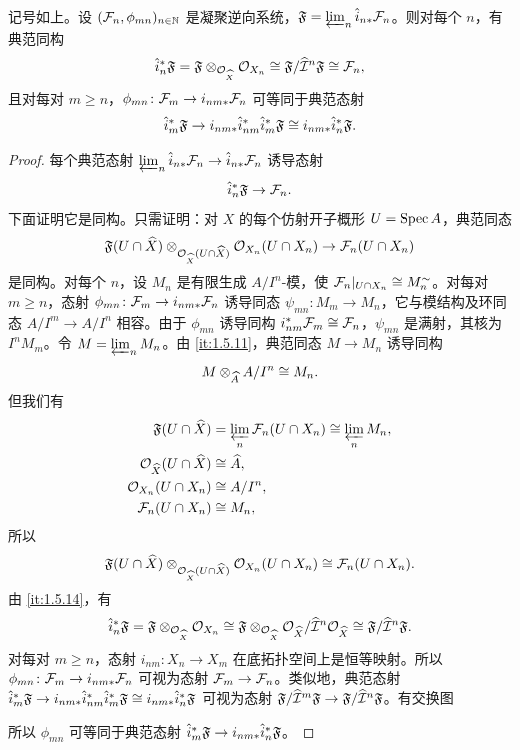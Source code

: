 \begin{proposition}\label{it:1.5.17}
记号如上。设 $(\mathcal{F}_n,\phi_{mn})_{n\in\mathbb{N}}$ 是凝聚逆向系统，$\mathfrak{F}=\varprojlim_n\hat i_{n*}\mathcal{F}_n$。则对每个 $n$，有典范同构
\[
\hat i_n^*\mathfrak{F}=\mathfrak{F}\otimes_{\mathcal{O}_{\widehat X}}\mathcal{O}_{X_n}\cong\mathfrak{F}/\widehat{\mathcal{I}}^n\mathfrak{F}\cong\mathcal{F}_n,
\]
且对每对 $m\ge n$，$\phi_{mn}\colon\mathcal{F}_m\to i_{nm*}\mathcal{F}_n$ 可等同于典范态射
\[
\hat i_m^*\mathfrak{F}\to i_{nm*}\hat i_{nm}^*\hat i_m^*\mathfrak{F}\cong i_{nm*}\hat i_n^*\mathfrak{F}.
\]
\end{proposition}

\begin{proof}
每个典范态射 $\varprojlim_n\hat i_{n*}\mathcal{F}_n\to\hat i_{n*}\mathcal{F}_n$ 诱导态射
\[
\hat i_n^*\mathfrak{F}\to\mathcal{F}_n.
\]
下面证明它是同构。只需证明：对 $X$ 的每个仿射开子概形 $U=\operatorname{Spec} A$，典范同态
\[
\mathfrak{F}(U\cap\widehat X)\otimes_{\mathcal{O}_{\widehat X}(U\cap\widehat X)}\mathcal{O}_{X_n}(U\cap X_n)\to\mathcal{F}_n(U\cap X_n)
\]
是同构。对每个 $n$，设 $M_n$ 是有限生成 $A/I^n$-模，使 $\mathcal{F}_n|_{U\cap X_n}\cong M_n^{\sim}$。对每对 $m\ge n$，态射 $\phi_{mn}\colon\mathcal{F}_m\to i_{nm*}\mathcal{F}_n$ 诱导同态 $\psi_{mn}\colon M_m\to M_n$，它与模结构及环同态 $A/I^m\to A/I^n$ 相容。由于 $\phi_{mn}$ 诱导同构 $i_{nm}^*\mathcal{F}_m\cong\mathcal{F}_n$，$\psi_{mn}$ 是满射，其核为 $I^nM_m$。令 $M=\varprojlim_n M_n$。由 \ref{it:1.5.11}，典范同态 $M\to M_n$ 诱导同构
\[
M\otimes_{\widehat A}A/I^n\cong M_n.
\]
但我们有
\begin{align*}
\mathfrak{F}(U\cap\widehat X)&=\varprojlim_n\mathcal{F}_n(U\cap X_n)\cong\varprojlim_n M_n,\\
\mathcal{O}_{\widehat X}(U\cap\widehat X)&\cong\widehat A,\\
\mathcal{O}_{X_n}(U\cap X_n)&\cong A/I^n,\\
\mathcal{F}_n(U\cap X_n)&\cong M_n,
\end{align*}
所以
\[
\mathfrak{F}(U\cap\widehat X)\otimes_{\mathcal{O}_{\widehat X}(U\cap\widehat X)}\mathcal{O}_{X_n}(U\cap X_n)\cong\mathcal{F}_n(U\cap X_n).
\]
由 \ref{it:1.5.14}，有
\[
\hat i_n^*\mathfrak{F}=\mathfrak{F}\otimes_{\mathcal{O}_{\widehat X}}\mathcal{O}_{X_n}\cong\mathfrak{F}\otimes_{\mathcal{O}_{\widehat X}}\mathcal{O}_{\widehat X}/\widehat{\mathcal{I}}^n\mathcal{O}_{\widehat X}\cong\mathfrak{F}/\widehat{\mathcal{I}}^n\mathfrak{F}.
\]
对每对 $m\ge n$，态射 $i_{nm}\colon X_n\to X_m$ 在底拓扑空间上是恒等映射。所以 $\phi_{mn}\colon\mathcal{F}_m\to i_{nm*}\mathcal{F}_n$ 可视为态射 $\mathcal{F}_m\to\mathcal{F}_n$。类似地，典范态射 $\hat i_m^*\mathfrak{F}\to i_{nm*}\hat i_{nm}^*\hat i_m^*\mathfrak{F}\cong i_{nm*}\hat i_n^*\mathfrak{F}$ 可视为态射 $\mathfrak{F}/\widehat{\mathcal{I}}^m\mathfrak{F}\to\mathfrak{F}/\widehat{\mathcal{I}}^n\mathfrak{F}$。有交换图
\begin{center}
\end{center}
所以 $\phi_{mn}$ 可等同于典范态射 $\hat i_m^*\mathfrak{F}\to i_{nm*}\hat i_n^*\mathfrak{F}$。
\end{proof}

